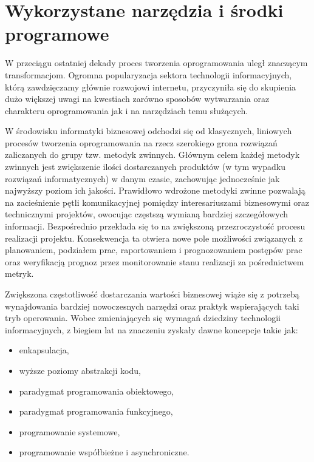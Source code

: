 \section{Wykorzystane narzędzia i środki programowe}\label{ss_internals-technologies}
W przeciągu ostatniej dekady proces tworzenia oprogramowania uległ znaczącym
transformacjom.
Ogromna popularyzacja sektora technologii informacyjnych, którą zawdzięczamy głównie rozwojowi internetu, przyczyniła się do skupienia dużo większej uwagi na kwestiach zarówno sposobów wytwarzania oraz charakteru oprogramowania jak i na narzędziach temu służących.

W środowisku informatyki biznesowej odchodzi się od klasycznych, liniowych procesów tworzenia oprogramowania na rzecz szerokiego grona rozwiązań zaliczanych do grupy tzw. metodyk zwinnych. 
Głównym celem każdej metodyk zwinnych jest zwiększenie ilości dostarczanych produktów (w tym wypadku rozwiązań informatycznych) w danym czasie, zachowując jednocześnie jak najwyższy poziom ich jakości.
Prawidłowo wdrożone metodyki zwinne pozwalają na zacieśnienie pętli komunikacyjnej pomiędzy interesariuszami biznesowymi oraz technicznymi projektów, owocując częstszą wymianą bardziej szczegółowych informacji.
Bezpośrednio przekłada się to na zwiększoną przezroczystość procesu realizacji projektu.
Konsekwencja ta otwiera nowe pole możliwości związanych z planowaniem, podziałem prac, raportowaniem i prognozowaniem postępów prac oraz weryfikacją prognoz przez monitorowanie stanu realizacji za pośrednictwem metryk.

\par{
Zwiększona częstotliwość dostarczania wartości biznesowej wiąże się z potrzebą wynajdowania bardziej nowoczesnych narzędzi oraz praktyk wspierających taki tryb operowania.
Wobec zmieniających się wymagań dziedziny technologii informacyjnych, z biegiem lat na znaczeniu zyskały dawne koncepcje takie jak:

\begin{itemize}
  \item enkapsulacja,
  \item wyższe poziomy abstrakcji kodu,
  \item paradygmat programowania obiektowego,
  \item paradygmat programowania funkcyjnego,
  \item programowanie systemowe,
  \item programowanie współbieżne i asynchroniczne.
\end{itemize}
}

